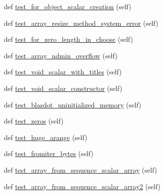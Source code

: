 \begin{DoxyCompactItemize}
\item 
def \hyperlink{classnumpy_1_1core_1_1tests_1_1test__regression_1_1TestRegression_a4ccde310ba0bd3162ae2ce65811d19d6}{test\+\_\+for\+\_\+object\+\_\+scalar\+\_\+creation} (self)
\item 
def \hyperlink{classnumpy_1_1core_1_1tests_1_1test__regression_1_1TestRegression_a0395623d999b54f4b86db3225b72a7ec}{test\+\_\+array\+\_\+resize\+\_\+method\+\_\+system\+\_\+error} (self)
\item 
def \hyperlink{classnumpy_1_1core_1_1tests_1_1test__regression_1_1TestRegression_ac8612da5c9049ee2e28c07235661e8e6}{test\+\_\+for\+\_\+zero\+\_\+length\+\_\+in\+\_\+choose} (self)
\item 
def \hyperlink{classnumpy_1_1core_1_1tests_1_1test__regression_1_1TestRegression_abb5a71980119107b7a0fa9f732450590}{test\+\_\+array\+\_\+ndmin\+\_\+overflow} (self)
\item 
def \hyperlink{classnumpy_1_1core_1_1tests_1_1test__regression_1_1TestRegression_aa7d487ae76d58f26d050f041c78f8c1c}{test\+\_\+void\+\_\+scalar\+\_\+with\+\_\+titles} (self)
\item 
def \hyperlink{classnumpy_1_1core_1_1tests_1_1test__regression_1_1TestRegression_a45c4876925c83bd6fb984395b3f0882d}{test\+\_\+void\+\_\+scalar\+\_\+constructor} (self)
\item 
def \hyperlink{classnumpy_1_1core_1_1tests_1_1test__regression_1_1TestRegression_a01f6a4a7a9ce5af911e627ad2af0f39a}{test\+\_\+blasdot\+\_\+uninitialized\+\_\+memory} (self)
\item 
def \hyperlink{classnumpy_1_1core_1_1tests_1_1test__regression_1_1TestRegression_ad5f8921087fa06337a51b51fa12ac9c6}{test\+\_\+zeros} (self)
\item 
def \hyperlink{classnumpy_1_1core_1_1tests_1_1test__regression_1_1TestRegression_a26fdc1503226965cddb03940c707a466}{test\+\_\+huge\+\_\+arange} (self)
\item 
def \hyperlink{classnumpy_1_1core_1_1tests_1_1test__regression_1_1TestRegression_a513bd532d9292373d49d9718ab99c1e1}{test\+\_\+fromiter\+\_\+bytes} (self)
\item 
def \hyperlink{classnumpy_1_1core_1_1tests_1_1test__regression_1_1TestRegression_a8b862df94acab94d57f9ad5f01cf8feb}{test\+\_\+array\+\_\+from\+\_\+sequence\+\_\+scalar\+\_\+array} (self)
\item 
def \hyperlink{classnumpy_1_1core_1_1tests_1_1test__regression_1_1TestRegression_ad1c1c3e9e46c713f3e984f2b6a6157b6}{test\+\_\+array\+\_\+from\+\_\+sequence\+\_\+scalar\+\_\+array2} (self)

\end{DoxyCompactItemize}
